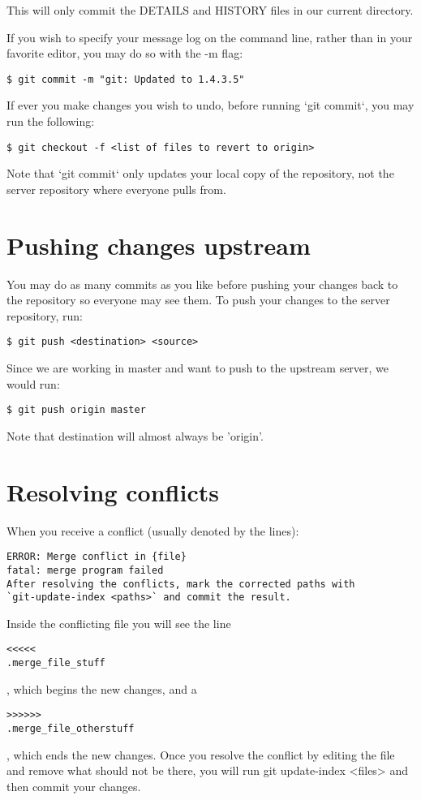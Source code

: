 \documentclass[a4paper,10pt]{book}
\begin{document}
This will only commit the DETAILS and HISTORY files in our current
directory.

If you wish to specify your message log on the command line, rather than in
your favorite editor, you may do so with the -m flag:
\begin{verbatim}
$ git commit -m "git: Updated to 1.4.3.5"
\end{verbatim}

If ever you make changes you wish to undo, before running `git commit`, you
may run the following:
\begin{verbatim}
$ git checkout -f <list of files to revert to origin>
\end{verbatim}

Note that `git commit` only updates your local copy of the repository, not
the server repository where everyone pulls from.
\section{Pushing changes upstream}
You may do as many commits as you like before pushing your changes back to
the repository so everyone may see them. To push your changes to the server
repository, run:
\begin{verbatim}
$ git push <destination> <source>
\end{verbatim}

Since we are working in master and want to push to the upstream server, we
would run:
\begin{verbatim}
$ git push origin master
\end{verbatim}

Note that destination will almost always be 'origin'.

\section{Resolving conflicts}
When you receive a conflict (usually denoted by the lines):
\begin{verbatim}
ERROR: Merge conflict in {file}
fatal: merge program failed
After resolving the conflicts, mark the corrected paths with
`git-update-index <paths>` and commit the result.
\end{verbatim}

Inside the conflicting file you will see the line \begin{verbatim}<<<<<
.merge_file_stuff\end{verbatim},
which begins the new changes, and a \begin{verbatim}>>>>>>
.merge_file_otherstuff\end{verbatim}, which
ends the new changes. Once you resolve the conflict by editing the file
and remove what should not be there, you will run \textdollar git update-index
<files>
and then commit your changes.
\end{document}
